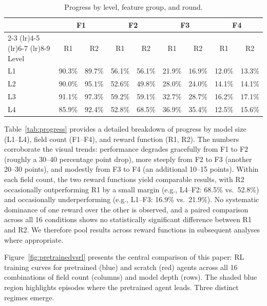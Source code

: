 
\begin{table}[ht]
\centering
\begin{tabular}{lcccccccc}
\toprule
& \multicolumn{2}{c}{F1} & \multicolumn{2}{c}{F2} & \multicolumn{2}{c}{F3} & \multicolumn{2}{c}{F4} \\
\cmidrule(lr){2-3} \cmidrule(lr){4-5} \cmidrule(lr){6-7} \cmidrule(lr){8-9}
Level & R1 & R2 & R1 & R2 & R1 & R2 & R1 & R2 \\
\midrule
L1 & 90.3\% & 89.7\% & 56.1\% & 56.1\% & 21.9\% & 16.9\% & 12.0\% & 13.3\% \\
L2 & 90.0\% & 95.1\% & 52.6\% & 49.8\% & 28.0\% & 24.0\% & 14.1\% & 14.1\% \\
L3 & 91.1\% & 97.3\% & 59.2\% & 59.1\% & 32.7\% & 28.7\% & 16.2\% & 17.1\% \\
L4 & 85.9\% & 92.4\% & 52.8\% & 68.5\% & 36.9\% & 35.4\% & 12.5\% & 15.6\% \\
\bottomrule
\end{tabular}
\caption{Progress by level, feature group, and round.}
\end{table}

Table~\ref{tab:progress} provides a detailed breakdown of progress by model size (L1--L4), field count (F1--F4), and reward function (R1, R2). The numbers corroborate the visual trends: performance degrades gracefully from F1 to F2 (roughly a 30--40 percentage point drop), more steeply from F2 to F3 (another 20--30 points), and modestly from F3 to F4 (an additional 10--15 points). Within each field count, the two reward functions yield comparable results, with R2 occasionally outperforming R1 by a small margin (e.g., L4--F2: 68.5\% vs.\ 52.8\%) and occasionally underperforming (e.g., L1--F3: 16.9\% vs.\ 21.9\%). No systematic dominance of one reward over the other is observed, and a paired comparison across all 16 conditions shows no statistically significant difference between R1 and R2. We therefore pool results across reward functions in subsequent analyses where appropriate.




Figure~\ref{fig:pretrainedvsrl} presents the central comparison of this paper: RL training curves for pretrained (blue) and scratch (red) agents across all 16 combinations of field count (columns) and model depth (rows). The shaded blue region highlights episodes where the pretrained agent leads. Three distinct regimes emerge.

